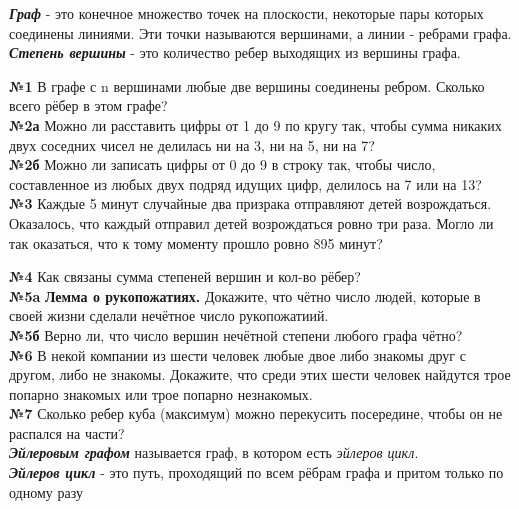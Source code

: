 \documentclass[12 pt, a4paper]{article}%
\newcommand{\task}[1]{{{\vspace{0.6cm} \vspace{-2ex} \textbf{№{#1}}  }}}
\begin{document}
	\large
	\raggedright
	\textbf{\textit{Граф}} - это конечное множество точек на плоскости, некоторые
	пары которых соединены линиями. Эти точки называются вершинами, а линии -
	ребрами графа.\\
	\textbf{\textit{Степень вершины}} - это количество ребер выходящих из вершины графа.
	
	\task{1} В графе с  n вершинами любые две вершины соединены ребром. Сколько
	всего рёбер в этом графе?\\
	\task{2а} Можно ли расставить цифры от 1 до 9 по кругу так, чтобы сумма никаких двух
	соседних чисел не делилась ни на 3, ни на 5, ни на 7?\\
	\vspace{-1ex}
	\task{2б}Можно ли записать цифры от 0 до 9 в строку так, чтобы число, составленное
	из любых двух подряд идущих цифр, делилось на 7 или на 13?\\
	
	\task{3}Каждые 5 минут случайные два призрака отправляют детей возрождаться.
	Оказалось, что каждый отправил детей возрождаться ровно три раза. Могло ли так оказаться, что к тому моменту прошло ровно 895 минут?
	
	\task{4} Как связаны сумма степеней вершин и кол-во рёбер?\\
	
	\task{5a} \textbf{Лемма о рукопожатиях.} Докажите, что чётно число людей, которые в своей
	жизни сделали нечётное число рукопожатиий.\\
	
	\task{5б} Верно ли, что число вершин нечётной степени любого графа чётно?\\
	
	\task{6} В некой компании из шести человек любые двое либо знакомы друг с другом, либо не
	знакомы. Докажите, что среди этих шести человек найдутся трое попарно знакомых или трое попарно незнакомых.\\
	
	\task{7} Сколько ребер куба (максимум) можно перекусить посередине, чтобы
	он не распался на части?\\
	
	\textit{\textbf{Эйлеровым графом}} называется граф, в котором есть \textit{эйлеров цикл}.\\
	\textbf{\textit{Эйлеров цикл}} - это путь, проходящий по всем рёбрам графа и притом только по одному разу\\
	
	\newpage
	
\end{document}
